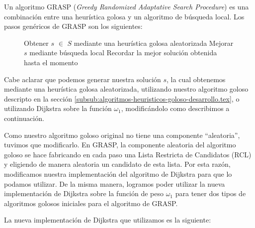 Un algoritmo GRASP (\emph{Greedy Randomized Adaptative Search Procedure}) es una combinación entre una heurística golosa y un algoritmo de búsqueda local. Los pasos genéricos de GRASP son los siguientes:

\begin{center}
 \begin{figure}[H]
  \begin{pseudo}
    \State Obtener $s$ $\in$ $S$ mediante una heurística golosa aleatorizada
    \State Mejorar $s$ mediante búsqueda local
    \State Recordar la mejor solución obtenida hasta el momento
    \EndWhile
    \EndProcedure
  \end{pseudo}
 \end{figure}
\end{center}

Cabe aclarar que podemos generar nuestra solución $s$, la cual obtenemos mediante una heurística golosa aleatorizada, utilizando nuestro algoritmo goloso descripto en la sección \ref{subsub:algoritmos-heuristicos-goloso-desarrollo.tex}, o utilizando Dijkstra sobre la función $\omega_1$, modificándolo como describimos a continuación.

Como nuestro algoritmo goloso original no tiene una componente ``aleatoria'', tuvimos que modificarlo. En GRASP, la componente aleatoria del algoritmo goloso se hace  fabricando en cada paso una Lista Restricta de Candidatos (RCL) y eligiendo de manera aleatoria un candidato de esta lista. Por esta razón, modificamos nuestra implementación del algoritmo de Dijkstra para que lo podamos utilizar. De la misma manera, logramos poder utilizar la nueva implementación de Dijkstra sobre la función de peso $\omega_1$ para tener dos tipos de algoritmos golosos iniciales para el algoritmo de GRASP.

La nueva implementación de Dijkstra que utilizamos es la siguiente:

